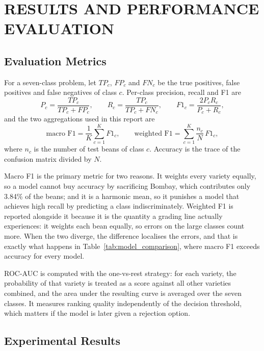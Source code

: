 \chapter{RESULTS AND PERFORMANCE EVALUATION}

\section{Evaluation Metrics}

For a seven-class problem, let $TP_c$, $FP_c$ and $FN_c$ be the true positives,
false positives and false negatives of class $c$. Per-class precision, recall and
F1 are
\begin{equation}
  P_c = \frac{TP_c}{TP_c + FP_c}, \qquad
  R_c = \frac{TP_c}{TP_c + FN_c}, \qquad
  F1_c = \frac{2P_cR_c}{P_c + R_c},
  \label{eq:prf}
\end{equation}
and the two aggregations used in this report are
\begin{equation}
  \text{macro F1} = \frac{1}{K}\sum_{c=1}^{K} F1_c,
  \qquad
  \text{weighted F1} = \sum_{c=1}^{K}\frac{n_c}{N}\,F1_c ,
  \label{eq:aggregation}
\end{equation}
where $n_c$ is the number of test beans of class $c$. Accuracy is the trace of the
confusion matrix divided by $N$.

Macro F1 is the primary metric for two reasons. It weights every variety equally,
so a model cannot buy accuracy by sacrificing Bombay, which contributes only 3.84\%
of the beans; and it is a harmonic mean, so it punishes a model that achieves high
recall by predicting a class indiscriminately. Weighted F1 is reported alongside
it because it is the quantity a grading line actually experiences: it weights each
bean equally, so errors on the large classes count more. When the two diverge, the
difference localises the errors, and that is exactly what happens in
Table~\ref{tab:model_comparison}, where macro F1 exceeds accuracy for every model.

ROC-AUC is computed with the one-vs-rest strategy: for each variety, the
probability of that variety is treated as a score against all other varieties
combined, and the area under the resulting curve is averaged over the seven
classes. It measures ranking quality independently of the decision threshold,
which matters if the model is later given a rejection option.

\section{Experimental Results}

